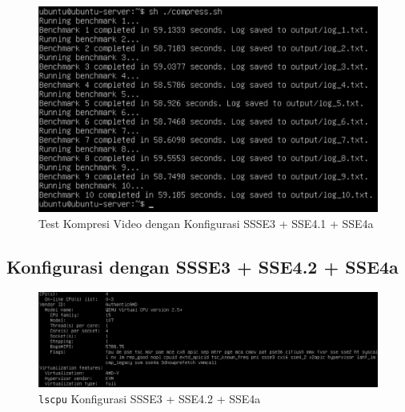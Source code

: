 \begin{figure}
    \centering
    \includegraphics[width=1\textwidth]
    {assets/pics/video-compression-test/ssse3,sse4.1,sse4a.jpeg}
    \caption{Test Kompresi Video dengan Konfigurasi SSSE3 + SSE4.1 + SSE4a}
    \label{fig:video_compression_test_ssse3,sse4.1,sse4a}
\end{figure}

\subsection{Konfigurasi dengan SSSE3 + SSE4.2 + SSE4a}
\begin{figure}
    \centering
    \includegraphics[width=1\textwidth]
    {assets/pics/video-compression-test/lscpu_ssse3,sse4.2,sse4a.jpeg}
    \caption{\texttt{lscpu} Konfigurasi SSSE3 + SSE4.2 + SSE4a}
    \label{fig:lscpu_video_compression_test_ssse3,sse4.2,sse4a.jpeg}
\end{figure}

